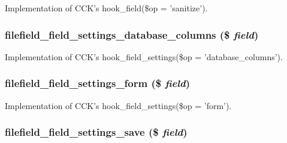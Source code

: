 Implementation of CCK's hook\_\-field(\$op = 'sanitize'). \hypertarget{filefield__field_8inc_3a17fa6008257cf098c9b3ef2a9a2435}{
\subsubsection[{filefield\_\-field\_\-settings\_\-database\_\-columns}]{\setlength{\rightskip}{0pt plus 5cm}filefield\_\-field\_\-settings\_\-database\_\-columns (\$ {\em field})}}
\label{filefield__field_8inc_3a17fa6008257cf098c9b3ef2a9a2435}


Implementation of CCK's hook\_\-field\_\-settings(\$op = 'database\_\-columns'). \hypertarget{filefield__field_8inc_469d1a37efae31ac9b3ce301d23b5891}{
\subsubsection[{filefield\_\-field\_\-settings\_\-form}]{\setlength{\rightskip}{0pt plus 5cm}filefield\_\-field\_\-settings\_\-form (\$ {\em field})}}
\label{filefield__field_8inc_469d1a37efae31ac9b3ce301d23b5891}


Implementation of CCK's hook\_\-field\_\-settings(\$op = 'form'). \hypertarget{filefield__field_8inc_3140908db83ca6d2ec9d8cdabbea3941}{
\subsubsection[{filefield\_\-field\_\-settings\_\-save}]{\setlength{\rightskip}{0pt plus 5cm}filefield\_\-field\_\-settings\_\-save (\$ {\em field})}}
\label{filefield__field_8inc_3140908db83ca6d2ec9d8cdabbea3941}


